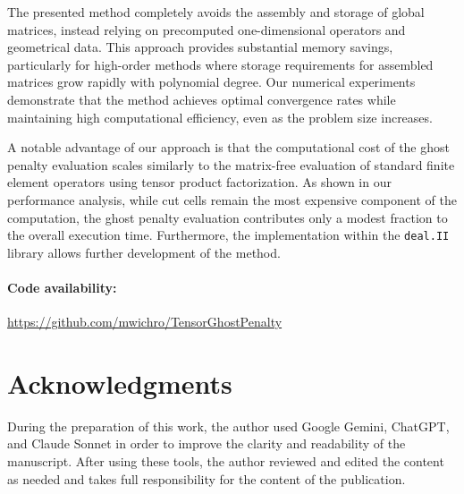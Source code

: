 \documentclass[11pt,a4paper]{article}
\begin{document}
The presented method completely avoids the assembly and storage of global matrices, instead relying on precomputed
one-dimensional operators and geometrical data. This approach provides substantial memory savings, particularly for
high-order methods where storage requirements for assembled matrices grow rapidly with polynomial degree. Our numerical
experiments demonstrate that the method achieves optimal convergence rates while maintaining high computational
efficiency, even as the problem size increases.

A notable advantage of our approach is that the computational cost of the ghost penalty evaluation scales similarly to
the matrix-free evaluation of standard finite element operators using tensor product factorization. As shown in our
performance analysis, while cut cells remain the most expensive component of the computation, the ghost penalty
evaluation contributes only a modest fraction to the overall execution time. Furthermore, the implementation within the
\texttt{deal.II} library allows further development of the method.

\paragraph*{Code availability:} \url{https://github.com/mwichro/TensorGhostPenalty}
\section*{Acknowledgments}
During the preparation of this work, the author used Google Gemini, ChatGPT, and Claude Sonnet in order to improve the
clarity and readability of the manuscript. After using these tools, the author reviewed and edited the content as
needed and takes full responsibility for the content of the publication.



\end{document}
